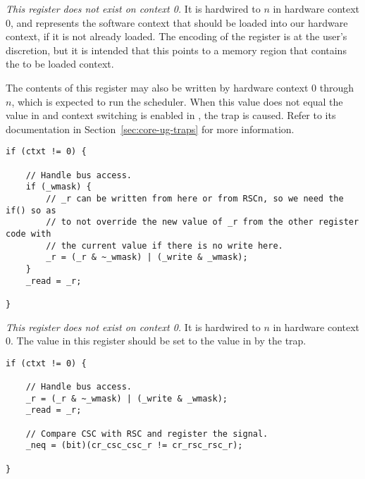 
\emph{This register does not exist on context 0.} It is hardwired to
$n$ in hardware context 0, and represents the software context that
should be loaded into our hardware context, if it is not already loaded. The
encoding of the register is at the user's discretion, but it is intended that
this points to a memory region that contains the to be loaded context.

The contents of this register may also be written by hardware context 0 through
$n$, which is expected to run the scheduler. When this value does not
equal the value in   and context switching is enabled in ,
the  trap is caused. Refer to its documentation in
Section~\ref{sec:core-ug-traps} for more information.

\declaration{}
\implementation{}
\begin{lstlisting}
if (ctxt != 0) {
    
    // Handle bus access.
    if (_wmask) {
        // _r can be written from here or from RSCn, so we need the if() so as
        // to not override the new value of _r from the other register code with
        // the current value if there is no write here.
        _r = (_r & ~_wmask) | (_write & _wmask);
    }
    _read = _r;
    
}
\end{lstlisting}


\emph{This register does not exist on context 0.} It is hardwired to
$n$ in hardware context 0. The value in this register should be set
to the value in  by the  trap.

\declaration{}
\implementation{}
\begin{lstlisting}
if (ctxt != 0) {
    
    // Handle bus access.
    _r = (_r & ~_wmask) | (_write & _wmask);
    _read = _r;
    
    // Compare CSC with RSC and register the signal.
    _neq = (bit)(cr_csc_csc_r != cr_rsc_rsc_r);
    
}
\end{lstlisting} %

